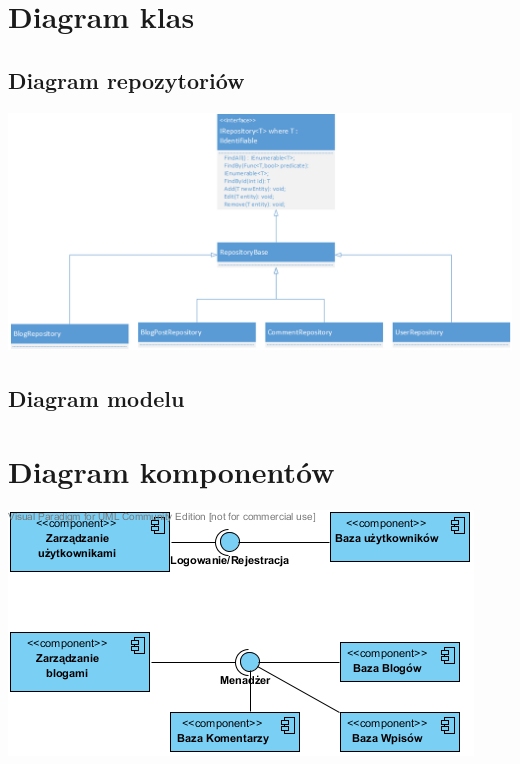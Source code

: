 \documentclass{article}
\begin{document}
\section{Diagram klas}
\subsection{Diagram repozytoriów}
\includegraphics[width=\textwidth]{RepositoryClassDiagram}
\subsection{Diagram modelu}
\section{Diagram komponentów}
\includegraphics[width=\textwidth]{ComponetDiagram}
\end{document}

